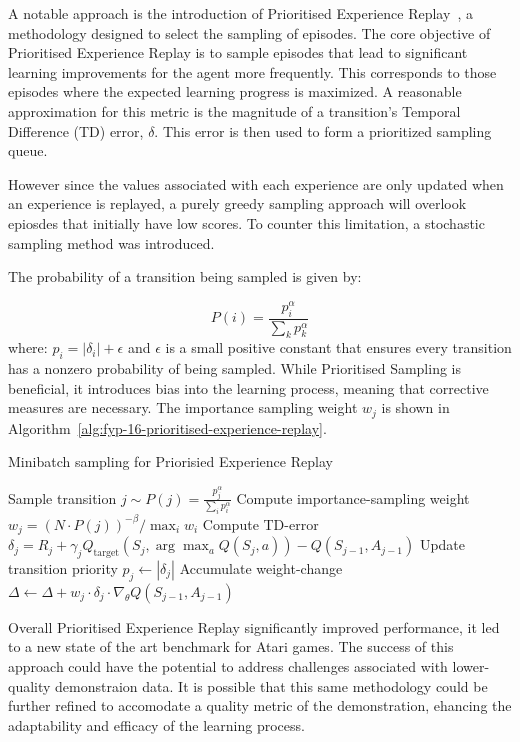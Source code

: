 A notable approach is the introduction of Prioritised Experience Replay~\cite{fyp-16-prioritised-experience-replay}, a methodology designed to select the sampling of episodes. 
The core objective of Prioritised Experience Replay is to sample episodes that lead to significant learning improvements for the agent more frequently. 
This corresponds to those episodes where the expected learning progress is maximized. 
A reasonable approximation for this metric is the magnitude of a transition's Temporal Difference (TD) error, $\delta$. 
This error is then used to form a prioritized sampling queue.

However since the values associated with each experience are only updated when an experience is replayed, a purely greedy sampling approach will overlook epiosdes that initially have low scores.
To counter this limitation, a stochastic sampling method was introduced.

The probability of a transition being sampled is given by:

\[ P(i) = \frac{p_{i}^{\alpha}}{\sum_{k} p_{k}^{\alpha}} \]
where: $p_{i} = |\delta_{i}| + \epsilon$ and $\epsilon$ is a small positive constant that ensures every transition has a nonzero probability of being sampled.
While Prioritised Sampling is beneficial, it introduces bias into the learning process, meaning that corrective measures are necessary. 
The importance sampling weight $w_j$ is shown in Algorithm~\ref{alg:fyp-16-prioritised-experience-replay}.

\begin{algorithm}
  \caption{Minibatch sampling for Priorisied Experience Replay}
  \label{alg:fyp-16-prioritised-experience-replay}
  \begin{algorithmic}[1]
      \State Sample transition $j \sim P(j) = \frac{p^{\alpha}_j}{\sum_i p^{\alpha}_i}$
      \State Compute importance-sampling weight $w_j = \left( N \cdot P(j) \right)^{-\beta} / \max_i w_i$
      \State Compute TD-error $\delta_j = R_j + \gamma_j Q_{\text{target}} \left( S_j, \arg\max_a Q(S_j, a) \right) - Q(S_{j-1}, A_{j-1})$
      \State Update transition priority $p_j \leftarrow |\delta_j|$
      \State Accumulate weight-change $\Delta \leftarrow \Delta + w_j \cdot \delta_j \cdot \nabla_{\theta}Q(S_{j-1}, A_{j-1})$
  \EndFor
  \end{algorithmic}
  \end{algorithm}  
  

Overall Prioritised Experience Replay significantly improved performance, it led to a new state of the art benchmark for Atari games.
The success of this approach could have the potential to address challenges associated with lower-quality demonstraion data.
It is possible that this same methodology could be further refined to accomodate a quality metric of the demonstration, ehancing the adaptability and efficacy of the learning process. \\\\



